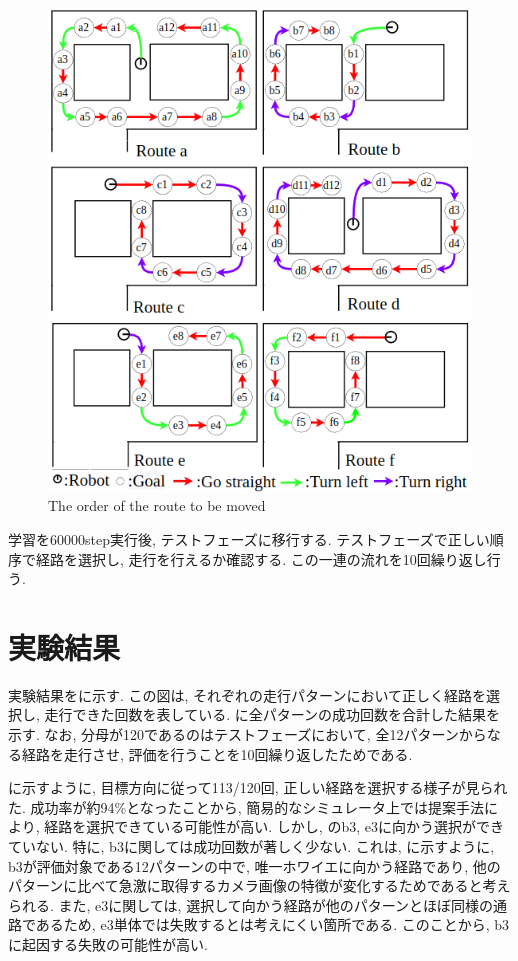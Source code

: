 \begin{figure}[hbtp]
  \centering
 \includegraphics[keepaspectratio, scale=0.6]
      {images/route.png}
 \caption{The order of the route to be moved}
 \label{Fig:route}
\end{figure}

 学習を60000step実行後, テストフェーズに移行する. テストフェーズで正しい順序で経路を選択し, 走行を行えるか確認する. この一連の流れを10回繰り返し行う.


  \section{実験結果}
  実験結果をに示す. この図は, それぞれの走行パターンにおいて正しく経路を選択し, 走行できた回数を表している. に全パターンの成功回数を合計した結果を示す. なお, 分母が120であるのはテストフェーズにおいて, 全12パターンからなる経路を走行させ, 評価を行うことを10回繰り返したためである. 
  \par
  に示すように, 目標方向に従って113/120回, 正しい経路を選択する様子が見られた. 成功率が約94\%となったことから, 簡易的なシミュレータ上では提案手法により, 経路を選択できている可能性が高い. しかし, のb3, e3に向かう選択ができていない. 特に, b3に関しては成功回数が著しく少ない. これは, に示すように, b3が評価対象である12パターンの中で, 唯一ホワイエに向かう経路であり, 他のパターンに比べて急激に取得するカメラ画像の特徴が変化するためであると考えられる. また, e3に関しては, 選択して向かう経路が他のパターンとほぼ同様の通路であるため, e3単体では失敗するとは考えにくい箇所である. このことから, b3に起因する失敗の可能性が高い.

